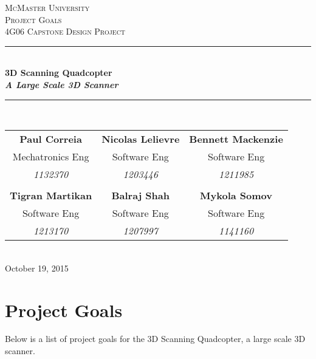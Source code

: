 \documentclass[10pt,letterpaper]{article}
\begin{document}
	
	
	\begin{titlepage}
		\newcommand{\HRule}{\rule{\linewidth}{0.5mm}}
		\center
		
		\textsc{\LARGE McMaster University}\\[1.5cm] %
		\textsc{\Large Project Goals}\\[0.5cm] %
		\textsc{\large 4G06 Capstone Design Project}\\[0.5cm] %
		
		\HRule \\[0.4cm]
		{ \huge \bfseries 3D Scanning Quadcopter \\[2mm] \textit{A Large Scale 3D Scanner}}\\[0.4cm] %
		\HRule \\[1.5cm]
		
		\begin{tabular}{ccc}
			\bf{Paul Correia}		& \bf{Nicolas Lelievre} 	& \bf{Bennett Mackenzie}		\\
			Mechatronics Eng 		& Software Eng 				& Software Eng 					\\
			\textit{1132370} 		& \textit{1203446}			& \textit{1211985} 				\\ \\
			\bf{Tigran Martikan} 	& \bf{Balraj Shah} 			& \bf{Mykola Somov} 			\\
			Software Eng			& Software Eng				& Software Eng 					\\
			\textit{1213170} 		& \textit{1207997}			& \textit{1141160}
		\end{tabular}\\[4cm]
		
		{\large October 19, 2015}\\[3cm] 
		
		
		\vfill %
		
	\end{titlepage}
	
	
\tableofcontents

\newpage
	

\section{Project Goals}
Below is a list of project goals for the 3D Scanning Quadcopter, a large scale 3D scanner. 
\end{document}
